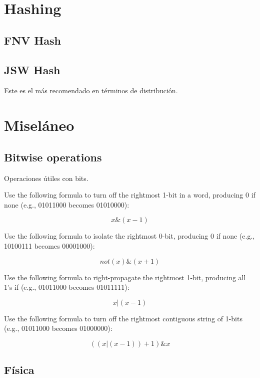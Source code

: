 \documentclass[10pt,letterpaper,twocolumn,twosided]{article}
\newcommand{\codigofuente}[1]{

\dotfill
}
\begin{document}
\section{Hashing} %

\subsection{FNV Hash}

\codigofuente{src/hashing/FNV.cpp}

\subsection{JSW Hash}
Este es el más recomendado en términos de distribución.
\codigofuente{src/hashing/JSW.cpp}

\section{Miseláneo}

\subsection {Bitwise operations}
Operaciones útiles con bits.

Use the following formula to turn off the rightmost 1-bit in a word, producing
0 if none (e.g., 01011000 becomes 01010000):

$$x \& (x - 1)$$

Use the following formula to isolate the rightmost 0-bit, producing 0 if none
(e.g., 10100111 becomes 00001000):

$$ not(x) \& (x + 1)$$

Use the following formula to right-propagate the rightmost 1-bit, producing
all 1’s if  (e.g., 01011000 becomes 01011111):

$$ x | (x - 1 )$$

Use the following formula to turn off the rightmost contiguous string of 1-bits
(e.g., 01011000 becomes 01000000):

$$ ((x | (x - 1 )) + 1 ) \& x$$

\codigofuente{src/bitwise.cpp}

\subsection{Física}
\end{document}
